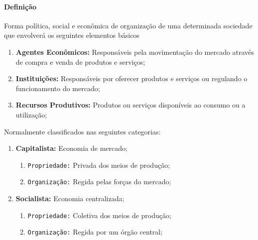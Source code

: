 \documentclass{article}
\begin{document}
            \paragraph{Definição}Forma política, social e econômica de organização de uma determinada sociedade que envolverá os seguintes elementos básicos
                \begin{enumerate}[noitemsep, rightmargin = \leftmargin]
                    \item \textbf{Agentes Econômicos:} Responsáveis pela movimentação do mercado através de compra e venda de produtos e serviços;

                    \item \textbf{Instituições:} Responsáveis por oferecer produtos e serviços ou regulando o funcionamento do mercado;

                    \item \textbf{Recursos Produtivos:} Produtos ou serviços disponíveis ao consumo ou a utilização;
                \end{enumerate}
            Normalmente classificados nas seguintes categorias:
                \begin{multicols}{2}
                    \begin{enumerate}[rightmargin = \leftmargin]
                        \item \textbf{Capitalista:} Economia de mercado;
                            \begin{enumerate}[noitemsep]
                                \item \texttt{Propriedade:} Privada dos meios de produção;
                                \item \texttt{Organização:} Regida pelas forças do mercado;
                            \end{enumerate}

                        \columnbreak

                        \item \textbf{Socialista:} Economia centralizada;
                            \begin{enumerate}[noitemsep]
                                \item \texttt{Propriedade:} Coletiva dos meios de produção;
                                \item \texttt{Organização:} Regida por um órgão central;
                            \end{enumerate}
                    \end{enumerate}
                \end{multicols}\noindent
\end{document}
